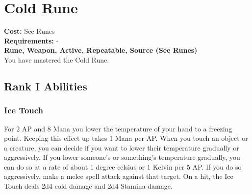 \section{Cold Rune}\label{rune:cold}
\textbf{Cost:} See Runes\\
\textbf{Requirements:} -\\
\textbf{Rune, Weapon, Active, Repeatable, Source (See Runes)}\\
You have mastered the Cold Rune.

\subsection{Rank I Abilities}

\subsubsection{Ice Touch}
For 2 AP and 8 Mana you lower the temperature of your hand to a freezing point.
Keeping this effect up takes 1 Mana per AP.
When you touch an object or a creature, you can decide if you want to lower their temperature gradually or aggressively.
If you lower someone's or something's temperature gradually, you can do so at a rate of about 1 degree celsius or 1 Kelvin per 5 AP.
If you do so aggressively, make a melee spell attack against that target.
On a hit, the Ice Touch deals 2d4 cold damage and 2d4 Stamina damage.